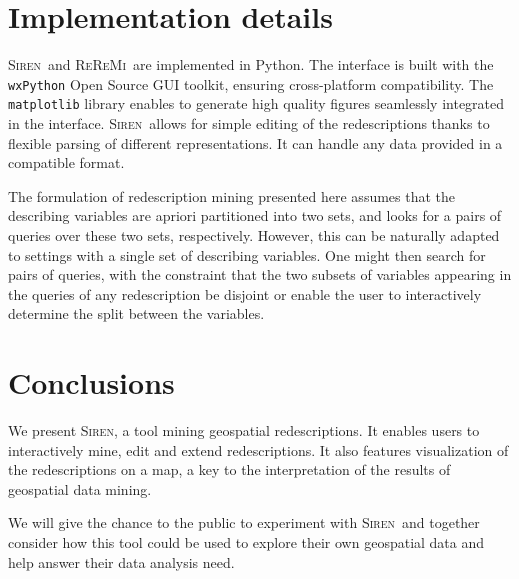 \documentclass{sig-alternate}
\newcommand{\Siren}{\textsc{Siren}}
\newcommand{\ReReMi}{\textsc{ReReMi}}
\begin{document}

\section{Implementation details}
\Siren\ and \ReReMi\ are implemented in Python.  The interface is built
with the \texttt{wxPython} Open Source GUI toolkit, ensuring
cross-platform compatibility.  The \texttt{matplotlib} library enables
to generate high quality figures seamlessly integrated in the
interface.  \Siren\ allows for simple editing of the redescriptions thanks to flexible parsing of different representations. It can handle any data provided in a compatible
format.

The formulation of redescription mining presented here assumes that
the describing variables are apriori partitioned into two sets, and
looks for a pairs of queries over these two sets, respectively.
However, this can be naturally adapted to settings with a single set
of describing variables.  One might then search for pairs of queries,
with the constraint that the two subsets of variables appearing in the
queries of any redescription be disjoint or enable the user to
interactively determine the split between the variables.

\section{Conclusions}
We present \Siren, a tool mining geospatial redescriptions. It enables
users to interactively mine, edit and extend redescriptions. It also
features visualization of the redescriptions on a map, a key to the
interpretation of the results of geospatial data mining.

We will give the chance to the public to experiment with \Siren\ and
together consider how this tool could be used to explore their own geospatial
data and help answer their data analysis need.


  
\balancecolumns

\end{document}
